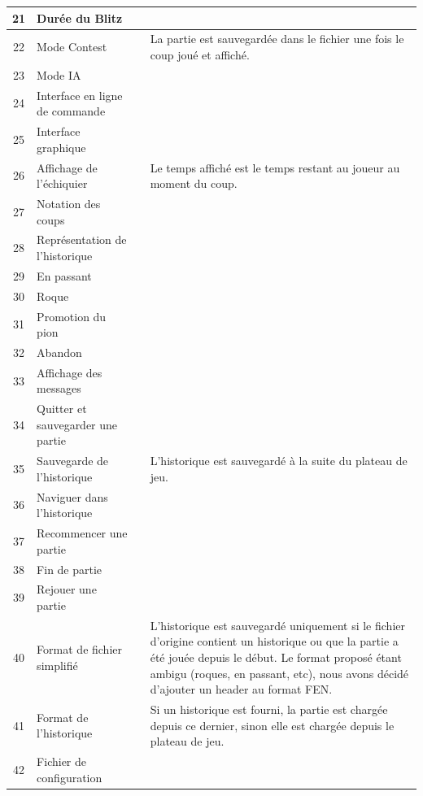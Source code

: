 \documentclass{article}
\newcommand{\valid}{\textcolor{green}{\ding{108}}}  %
\begin{document}
\begin{longtable}{|c|p{5cm}|c|p{5cm}|}
    \hline
    21 & Durée du Blitz & \valid & \\
    \hline
    22 & Mode Contest & \valid & La partie est sauvegardée dans le fichier une fois le coup joué et affiché.\\
    \hline
    23 & Mode IA & \valid & \\
    \hline
    24 & Interface en ligne de commande & \valid & \\
    \hline
    25 & Interface graphique & \valid & \\
    \hline
    26 & Affichage de l'échiquier & \valid & Le temps affiché est le temps restant au joueur au moment du coup.\\
    \hline
    27 & Notation des coups & \valid & \\
    \hline
    28 & Représentation de l'historique & \valid & \\
    \hline
    29 & En passant & \valid & \\
    \hline
    30 & Roque & \valid & \\
    \hline
    31 & Promotion du pion & \valid & \\
    \hline
    32 & Abandon & \valid & \\
    \hline
    33 & Affichage des messages & \valid & \\
    \hline
    34 & Quitter et sauvegarder une partie & \valid & \\
    \hline
    35 & Sauvegarde de l’historique & \valid & L'historique est sauvegardé à la suite du plateau de jeu. \\
    \hline
    36 & Naviguer dans l'historique & \valid & \\
    \hline
    37 & Recommencer une partie & \valid & \\
    \hline
    38 & Fin de partie & \valid & \\
    \hline
    39 & Rejouer une partie & \valid & \\
    \hline
    40 & Format de fichier simplifié & \valid & L'historique est sauvegardé uniquement si le fichier d'origine contient un historique ou que la partie a été jouée depuis le début. Le format proposé étant ambigu (roques, en passant, etc), nous avons décidé d'ajouter un header au format FEN. \\
    \hline
    41 & Format de l'historique & \valid & Si un historique est fourni, la partie est chargée depuis ce dernier, sinon elle est chargée depuis le plateau de jeu. \\
    \hline
    42 & Fichier de configuration & \valid & \\

\end{longtable}
\end{document}
